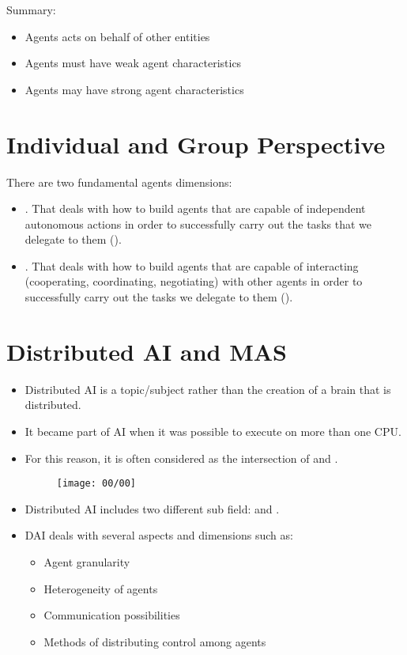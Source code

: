 \vfill
Summary:
\begin{itemize}
\item Agents acts on behalf of other entities
\item Agents must have weak agent characteristics
\item Agents may have strong agent characteristics
\end{itemize}

\section{Individual and Group Perspective}
There are two fundamental agents dimensions:
\begin{itemize}
\item {}. That deals with how to  build agents that are capable of independent autonomous actions in order to successfully carry out the tasks that we delegate to them ().
\item {}. That deals with how to build agents that are capable of interacting (cooperating, coordinating, negotiating) with other agents in order to successfully carry out the tasks we delegate to them ().
\end{itemize}

\section{Distributed AI and MAS}
\begin{itemize}
\item Distributed AI is a topic/subject rather than the creation of a brain that is distributed.
\item It became part of AI when it was possible to execute on more than one CPU.
\item For this reason, it is often considered as the intersection of  and .

\begin{figure}[!h]
\centering
\texttt{[image: 00/00]}
\end{figure}

\item Distributed AI includes two different sub field:  and .
\item DAI deals with several aspects and dimensions such as:
\begin{itemize}
\item Agent granularity
\item Heterogeneity of agents
\item Communication possibilities
\item Methods of distributing control among agents
\end{itemize}
\end{itemize}



